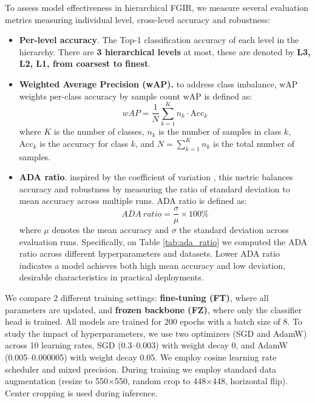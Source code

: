\documentclass[conference]{IEEEtran}
\begin{document}
To assess model effectiveness in hierarchical FGIR, we measure several evaluation metrics measuring individual level, cross-level accuracy and robustness:
\begin{itemize}
    \item \textbf{Per-level accuracy}. The Top-1 classification accuracy of each level in the hierarchy. There are \textbf{3 hierarchical levels} at most, these are denoted by \textbf{L3, L2, L1, from coarsest to finest}.

    \item \textbf{Weighted Average Precision (wAP).}  
    to address class imbalance, wAP weights per-class accuracy by sample count
    wAP is defined as:
    \[
    wAP = \frac{1}{N} \sum_{k=1}^{K} n_k \cdot \text{Acc}_k
    \]
    where $K$ is the number of classes, $n_k$ is the number of samples in class $k$, $\text{Acc}_k$ is the accuracy for class $k$, and $N = \sum_{k=1}^{K} n_k$ is the total number of samples.
    
    \item \textbf{ADA ratio}. 
    inspired by the coefficient of variation \cite{brown_applied_1998}, this metric balances accuracy and robustness by measuring the ratio of standard deviation to mean accuracy across multiple runs.
    ADA ratio is defined as:
    \[
    ADA\ ratio = \frac{\sigma}{\mu} \times 100\% 
    \]
    where $\mu$ denotes the mean accuracy and $\sigma$ the standard deviation across evaluation runs. Specifically, on Table \ref{tab:ada_ratio} we computed the ADA ratio across different hyperparameters and datasets. Lower ADA ratio indicates a model achieves both high mean accuracy and low deviation, desirable characteristics in practical deployments. 
\end{itemize}

We compare 2 different training settings: \textbf{fine-tuning (FT)}, where all parameters are updated, and \textbf{frozen backbone (FZ)}, where only the classifier head is trained. All models are trained for 200 epochs with a batch size of 8. To study the impact of hyperparameters, we use two optimizers (SGD and AdamW) across 10 learning rates, SGD (0.3–0.003) with weight decay 0, and AdamW (0.005–0.000005) with weight decay 0.05. We employ cosine learning rate scheduler and mixed precision. During training we employ standard data augmentation (resize to 550×550, random crop to 448×448, horizontal flip). Center cropping is used during inference.
\end{document}
